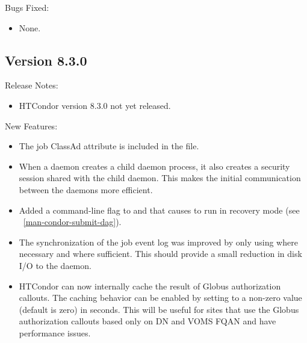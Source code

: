 \noindent Bugs Fixed:

\begin{itemize}

\item None.

\end{itemize}

\subsection*{\label{sec:New-8-3-0}Version 8.3.0}

\noindent Release Notes:

\begin{itemize}

\item HTCondor version 8.3.0 not yet released.

\end{itemize}


\noindent New Features:

\begin{itemize}

\item The job ClassAd attribute  is included in 
the  file.

\item When a daemon creates a child daemon process, it also creates a
security session shared with the child daemon.
This makes the initial communication between the daemons more efficient.

\item Added a  command-line flag to 
and  that causes  to run in
recovery mode (see ~\ref{man-condor-submit-dag}).

\item The synchronization of the job event log was improved by only
using  where necessary and 
 where sufficient.  
This should provide a small reduction in disk I/O to 
the  daemon.

\item HTCondor can now internally cache the result of Globus authorization
callouts.  The caching behavior can be enabled by setting
 to a non-zero value (default
is zero) in seconds.  This will be useful for sites that use the Globus authorization
callouts based only on DN and VOMS FQAN and have performance issues.

\end{itemize}

